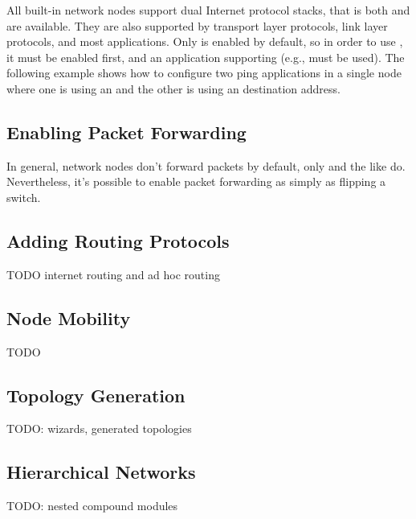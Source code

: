 All built-in network nodes support dual Internet protocol stacks, that is
both  and  are available. They are also
supported by transport layer protocols, link layer protocols, and most
applications. Only  is enabled by default, so in order to
use , it must be enabled first, and an application
supporting  (e.g.,  must be used). The
following example shows how to configure two ping applications in a single
node where one is using an  and the other is using an
 destination address.


\subsection{Enabling Packet Forwarding}
\label{sec:networks:enabling-packet-forwarding}

In general, network nodes don't forward packets by default, only
 and the like do. Nevertheless, it's possible to enable
packet forwarding as simply as flipping a switch.


\subsection{Adding Routing Protocols}

TODO internet routing and ad hoc routing

\subsection{Node Mobility}

TODO

\subsection{Topology Generation}

TODO: wizards, generated topologies

\subsection{Hierarchical Networks}

TODO: nested compound modules



